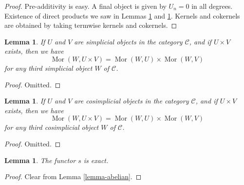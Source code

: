 \documentclass{stacks-project}
\theoremstyle{plain}
\newtheorem{lemma}[subsection]{Lemma}
\theoremstyle{definition}
\theoremstyle{remark}
\numberwithin{equation}{subsection}
\def\Mor{\mathop{\mathrm{Mor}}\nolimits}
\begin{document}
\begin{proof}
Pre-additivity is easy. A final object is
given by $U_n = 0$ in all degrees.
Existence of direct products we saw in
Lemmas \ref{lemma-product} and
\ref{lemma-product-cosimplicial-objects}.
Kernels and cokernels are obtained by taking
termwise kernels and cokernels.
\end{proof}

\begin{lemma}
\label{lemma-product}
If $U$ and $V$ are simplicial objects in the category $\mathcal{C}$,
and if $U \times V$ exists, then we have
$$
\Mor(W, U \times V) =
\Mor(W, U) \times
\Mor(W, V)
$$
for any third simplicial object $W$ of $\mathcal{C}$.
\end{lemma}

\begin{proof}
Omitted.
\end{proof}

\begin{lemma}
\label{lemma-product-cosimplicial-objects}
If $U$ and $V$ are cosimplicial objects in the category $\mathcal{C}$,
and if $U \times V$ exists, then we have
$$
\Mor(W, U \times V) =
\Mor(W, U) \times
\Mor(W, V)
$$
for any third cosimplicial object $W$ of $\mathcal{C}$.
\end{lemma}

\begin{proof}
Omitted.
\end{proof}

\begin{lemma}
\label{lemma-s-exact}
The functor $s$ is exact.
\end{lemma}

\begin{proof}
Clear from Lemma \ref{lemma-abelian}.
\end{proof}
\end{document}
